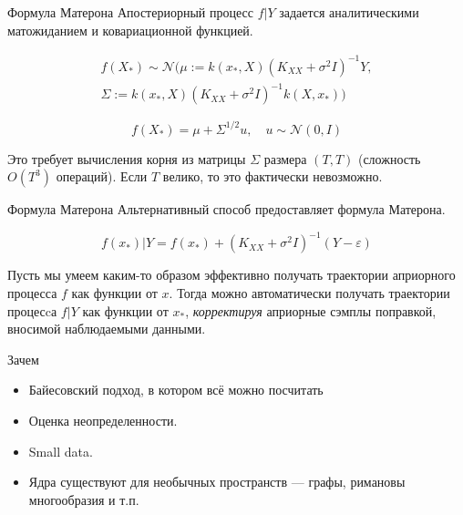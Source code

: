 \documentclass[fullscreen=true, bookmarks=true, hyperref={pdfencoding=unicode}]{beamer}
\begin{document}
\begin{frame}{Формула Матерона}
    Апостериорный процесс $f | Y$ задается аналитическими матожиданием и ковариационной функцией. %

    \begin{align*} f(X_*) \sim \mathcal{N}\Big(\mu := k(x_*, X)(K_{XX} + \sigma^2 I)^{-1}Y, \\ \Sigma := k(x_*, X) (K_{XX} + \sigma^2 I)^{-1} k(X, x_*) \Big) \end{align*}

    \pause
    $$ f(X_*) = \mu + \Sigma^{1/2} u, \quad u \sim \mathcal{N}(0, I) $$

    Это требует вычисления корня из матрицы $\Sigma$ размера $(T, T)$ (сложность $O(T^3)$ операций). Если $T$ велико, то это фактически невозможно.
\end{frame}

\begin{frame}{Формула Матерона}
    Альтернативный способ предоставляет формула Матерона.

    $$ f(x_*) | Y = f(x_*) + (K_{XX} + \sigma^2 I)^{-1}(Y - \varepsilon) $$

    Пусть мы умеем каким-то образом эффективно получать траектории априорного процесса $f$ как функции от $x$. Тогда
    можно автоматически получать траектории процесcа $f | Y$ как функции от $x_*$, \textit{корректируя} априорные сэмплы поправкой, вносимой наблюдаемыми данными.
\end{frame}




\begin{frame}{Зачем}

\begin{itemize}
    \item Байесовский подход, в котором всё можно посчитать  \normalsize
    \item<3-> Оценка неопределенности.
    \item<4-> Small data.
    \item<5-> Ядра существуют для необычных пространств --- графы, римановы многообразия и т.п.
\end{itemize}

\end{frame}
\end{document}
